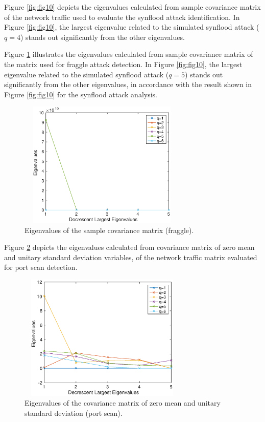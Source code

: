 \documentclass[review]{elsarticle}
\begin{document}
Figure \ref{fig:fig10} depicts the eigenvalues calculated from sample covariance matrix of the network traffic used to evaluate the synflood attack identification. In Figure \ref{fig:fig10}, the largest eigenvalue related to the simulated synflood attack ($q = 4$) stands out significantly from the other eigenvalues.

Figure \ref{fig:fig11} illustrates the eigenvalues calculated from sample covariance matrix of the matrix used for fraggle attack detection. In Figure \ref{fig:fig10}, the largest eigenvalue related to the simulated synflood attack ($q = 5$) stands out significantly from the other eigenvalues, in accordance with the result shown in Figure \ref{fig:fig10} for the synflood attack analysis.

\begin{figure}[h!]
	\centering
     \includegraphics[height=6cm, width=8cm]{results/figures/eigenvalues_fraggle.eps}
     \caption{Eigenvalues of the sample covariance matrix (fraggle).}
     \label{fig:fig11}
\end{figure}

Figure \ref{fig:fig12} depicts the eigenvalues calculated from covariance matrix of zero mean and unitary standard deviation variables, of the network traffic matrix evaluated for port scan detection. 

\begin{figure}[h!]
	\centering
     \includegraphics[height=6cm, width=8cm]{results/figures/eigenvalues_portscan.eps}
     \caption{Eigenvalues of the covariance matrix of zero mean and unitary standard deviation (port scan).}
     \label{fig:fig12}
\end{figure}
\end{document}
